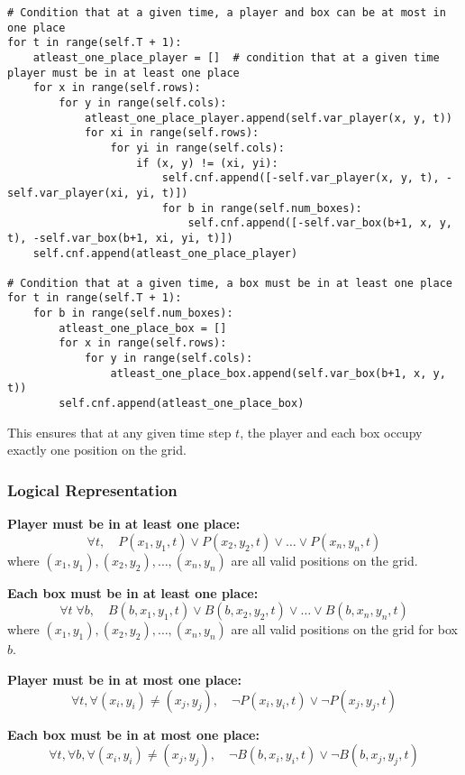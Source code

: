 \documentclass[12pt,a4paper]{article}
\begin{document}
\begin{lstlisting}
# Condition that at a given time, a player and box can be at most in one place
for t in range(self.T + 1):
    atleast_one_place_player = []  # condition that at a given time player must be in at least one place
    for x in range(self.rows):
        for y in range(self.cols):
            atleast_one_place_player.append(self.var_player(x, y, t))
            for xi in range(self.rows):
                for yi in range(self.cols):
                    if (x, y) != (xi, yi):
                        self.cnf.append([-self.var_player(x, y, t), -self.var_player(xi, yi, t)])
                        for b in range(self.num_boxes):
                            self.cnf.append([-self.var_box(b+1, x, y, t), -self.var_box(b+1, xi, yi, t)])
    self.cnf.append(atleast_one_place_player)

# Condition that at a given time, a box must be in at least one place
for t in range(self.T + 1):
    for b in range(self.num_boxes):
        atleast_one_place_box = []
        for x in range(self.rows):
            for y in range(self.cols):
                atleast_one_place_box.append(self.var_box(b+1, x, y, t))
        self.cnf.append(atleast_one_place_box)
\end{lstlisting}

This ensures that at any given time step \(t\), the player and each box occupy exactly one position on the grid.

\subsubsection*{Logical Representation}

\textbf{Player must be in at least one place:}
\[
\forall t, \quad P(x_1, y_1, t) \lor P(x_2, y_2, t) \lor \dots \lor P(x_n, y_n, t)
\]
where \((x_1, y_1), (x_2, y_2), \dots, (x_n, y_n)\) are all valid positions on the grid.

\textbf{Each box must be in at least one place:}
\[
\forall t \; \forall b, \quad B(b, x_1, y_1, t) \lor B(b, x_2, y_2, t) \lor \dots \lor B(b, x_n, y_n, t)
\]
where \((x_1, y_1), (x_2, y_2), \dots, (x_n, y_n)\) are all valid positions on the grid for box \(b\).

\textbf{Player must be in at most one place:}
\[
\forall t, \forall (x_i, y_i) \neq (x_j, y_j), \quad \neg P(x_i, y_i, t) \lor \neg P(x_j, y_j, t)
\]

\textbf{Each box must be in at most one place:}
\[
\forall t, \forall b, \forall (x_i, y_i) \neq (x_j, y_j), \quad \neg B(b, x_i, y_i, t) \lor \neg B(b, x_j, y_j, t)
\]
\end{document}
